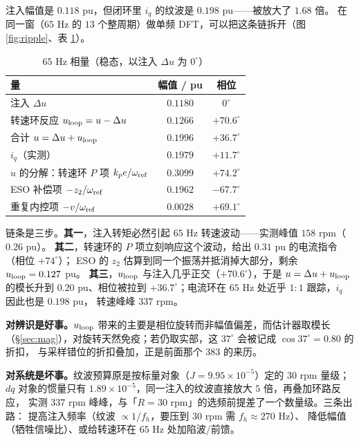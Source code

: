 \documentclass[11pt,a4paper]{ctexart}
\begin{document}
注入幅值是 $0.118$ pu，但闭环里 $i_q$ 的纹波是 $0.198$ pu——被放大了 $1.68$ 倍。
在同一窗（$65$ Hz 的 $13$ 个整周期）做单频 DFT，可以把这条链拆开（图 \ref{fig:ripple}、表 \ref{tab:phasor}）。

\begin{table}[H]
\centering
\caption{$65$ Hz 相量（稳态，以注入 $\Delta u$ 为 $0^\circ$）}
\label{tab:phasor}
\small
\begin{tabular}{lcc}
\toprule
量 & 幅值 / pu & 相位\\
\midrule
注入 $\Delta u$ & $0.1180$ & $0^\circ$\\
转速环反应 $u_{\rm loop}=u-\Delta u$ & $0.1266$ & $+70.6^\circ$\\
合计 $u=\Delta u+u_{\rm loop}$ & $0.1996$ & $+36.7^\circ$\\
$i_q$（实测） & $0.1979$ & $+11.7^\circ$\\
\midrule
$u$ 的分解：转速环 $P$ 项 $k_p e/\omega_{\rm ref}$ & $0.3099$ & $+74.2^\circ$\\
\quad ESO 补偿项 $-z_2/\omega_{\rm ref}$ & $0.1962$ & $-67.7^\circ$\\
\quad 重复内控项 $-v/\omega_{\rm ref}$ & $0.0028$ & $+69.1^\circ$\\
\bottomrule
\end{tabular}
\end{table}

链条是三步。\textbf{其一}，注入转矩必然引起 $65$ Hz 转速波动——实测峰值 $158$ rpm（$0.26$ pu）。
\textbf{其二}，转速环的 $P$ 项立刻响应这个波动，给出 $0.31$ pu 的电流指令（相位 $+74^\circ$）；
ESO 的 $z_2$ 估算到同一个振荡并抵消掉大部分，剩余 $u_{\rm loop}=0.127$ pu。
\textbf{其三}，$u_{\rm loop}$ 与注入几乎正交（$+70.6^\circ$），于是 $u=\Delta u+u_{\rm loop}$ 的模长升到
$0.20$ pu、相位被拉到 $+36.7^\circ$；电流环在 $65$ Hz 处近乎 $1{:}1$ 跟踪，$i_q$ 因此也是 $0.198$ pu，
转速峰峰 $337$ rpm。

\textbf{对辨识是好事。}$u_{\rm loop}$ 带来的主要是相位旋转而非幅值偏差，而估计器取模长
（\S\ref{sec:mag}），对旋转天然免疫；若仍取实部，这 $37^\circ$ 会被记成 $\cos37^\circ=0.80$ 的折扣，
与采样错位的折扣叠加，正是前面那个 $383$ 的来历。

\textbf{对系统是坏事。}纹波预算原是按标量对象（$J=9.95\times10^{-5}$）定的 $30$ rpm 量级；
$dq$ 对象的惯量只有 $1.89\times10^{-5}$，同一注入的纹波直接放大 $5$ 倍，再叠加环路反应，
实测 $337$ rpm 峰峰，与「$R=30$ rpm」的选频前提差了一个数量级。三条出路：
提高注入频率（纹波 $\propto1/f_h$，要压到 $30$ rpm 需 $f_h\approx270$ Hz）、
降低幅值（牺牲信噪比）、或给转速环在 $65$ Hz 处加陷波/前馈。
\end{document}
